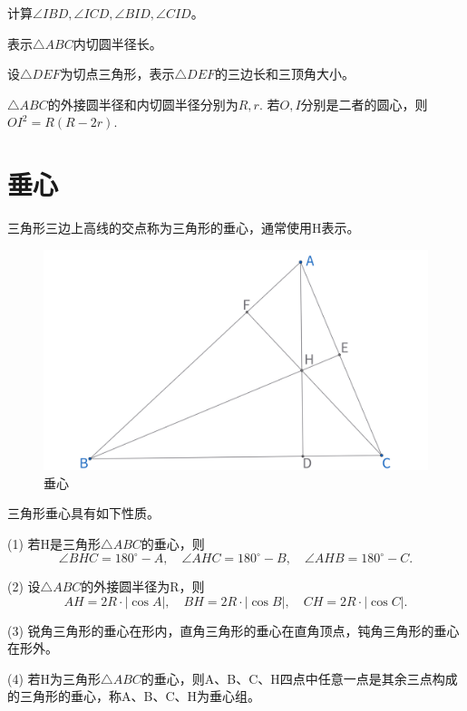 \begin{exercise}
    计算$\angle IBD, \angle ICD, \angle BID, \angle CID$。
\end{exercise}
\begin{exercise}
    表示$\triangle ABC$内切圆半径长。
\end{exercise}
\begin{exercise}
    设$\triangle DEF$为切点三角形，表示$\triangle DEF$的三边长和三顶角大小。
\end{exercise}
\begin{exercise}[内外径的欧拉定理]
    $\triangle ABC$的外接圆半径和内切圆半径分别为$R,r.$ 若$O,I$分别是二者的圆心，则$OI^2 = R(R-2r).$
\end{exercise}




\newpage
\section{垂心}
\begin{definition}[垂心]
    三角形三边上高线的交点称为三角形的垂心，通常使用H表示。
\end{definition}

\begin{figure}[H]
    \centering
    \includegraphics[width=0.8\linewidth]{figures/三角形五心/垂心.png}
    \caption{垂心}
\end{figure}

\begin{proposition}[垂心性质]
    三角形垂心具有如下性质。

    (1) 若H是三角形$\triangle ABC$的垂心，则
    $$\angle BHC = 180^\circ - A,\quad \angle AHC = 180^\circ - B,\quad \angle AHB =180^\circ - C.$$

    (2) 设$\triangle ABC$的外接圆半径为R，则
    $$AH=2R\cdot |\cos A|,\quad
    BH=2R\cdot |\cos B|,\quad
    CH=2R\cdot |\cos C|.$$

    (3) 锐角三角形的垂心在形内，直角三角形的垂心在直角顶点，钝角三角形的垂心在形外。

    (4) 若H为三角形$\triangle ABC$的垂心，则A、B、C、H四点中任意一点是其余三点构成的三角形的垂心，称A、B、C、H为垂心组。
\end{proposition}


